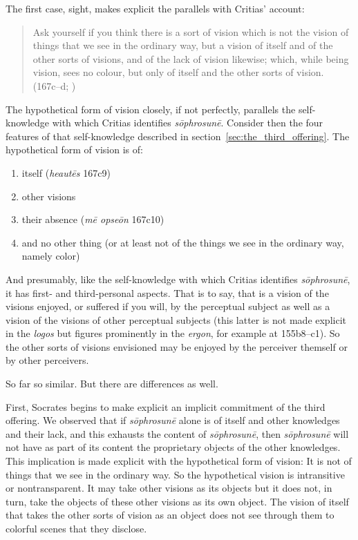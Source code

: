 The first case, sight, makes explicit the parallels with Critias' account:
\begin{quote}
	Ask yourself if you think there is a sort of vision which is not the vision of things that we see in the ordinary way, but a vision of itself and of the other sorts of visions, and of the lack of vision likewise; which, while being vision, sees no colour, but only of itself and the other sorts of vision. (167c–d; \citealt[59]{Lamb:1927qw})
\end{quote}
The hypothetical form of vision closely, if not perfectly, parallels the self-knowledge with which Critias identifies \emph{sōphrosunē}. Consider then the four features of that self-knowledge described in section~\ref{sec:the_third_offering}. The hypothetical form of vision is of:
\begin{enumerate}[(1)]
	\item itself (\emph{heautēs} 167c9)
	\item other visions
	\item their absence (\emph{mē opseōn} 167c10)
	\item and no other thing (or at least not of the things we see in the ordinary way, namely color)
\end{enumerate}
And presumably, like the self-knowledge with which Critias identifies \emph{sōphrosunē}, it has first- and third-personal aspects. That is to say, that is a vision of the visions enjoyed, or suffered if you will, by the perceptual subject as well as a vision of the visions of other perceptual subjects (this latter is not made explicit in the \emph{logos} but figures prominently in the \emph{ergon}, for example at 155b8–c1). So the other sorts of visions envisioned may be enjoyed by the perceiver themself or by other perceivers. 

So far so similar. But there are differences as well.

First, Socrates begins to make explicit an implicit commitment of the third offering. We observed that if \emph{sōphrosunē} alone is of itself and other knowledges and their lack, and this exhausts the content of \emph{sōphrosunē}, then \emph{sōphrosunē} will not have as part of its content the proprietary objects of the other knowledges. This implication is made explicit with the hypothetical form of vision: It is not of things that we see in the ordinary way. So the hypothetical vision is intransitive or nontransparent. It may take other visions as its objects but it does not, in turn, take the objects of these other visions as its own object. The vision of itself that takes the other sorts of vision as an object does not see through them to colorful scenes that they disclose.

